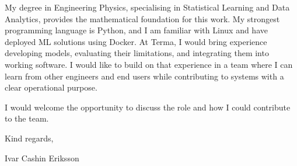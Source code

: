 \documentclass[11pt,a4paper]{moderncv}
\begin{document}
\vspace{4pt}
\hspace*{2em}
My degree in Engineering Physics, specialising in Statistical Learning and Data Analytics, provides the mathematical foundation for this work. My strongest programming language is Python, and I am familiar with Linux and have deployed ML solutions using Docker. At Terma, I would bring experience developing models, evaluating their limitations, and integrating them into working software. I would like to build on that experience in a team where I can learn from other engineers and end users while contributing to systems with a clear operational purpose.

\vspace*{2em}
I would welcome the opportunity to discuss the role and how I could contribute to the team.

\vspace{2em}
Kind regards,

Ivar Cashin Eriksson
\end{document}

